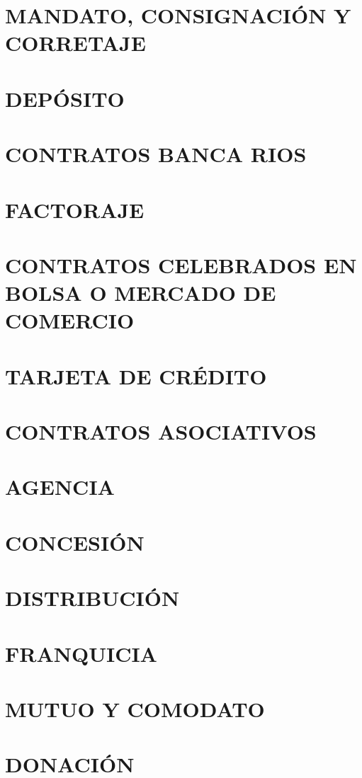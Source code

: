 \documentclass[12pt]{book}
\begin{document}
\chapter{MANDATO, CONSIGNACIÓN Y CORRETAJE}
\chapter{DEPÓSITO}
\chapter{CONTRATOS BANCA RIOS}
\chapter{FACTORAJE}
\chapter{CONTRATOS CELEBRADOS EN BOLSA O MERCADO DE COMERCIO}

\chapter{TARJETA DE CRÉDITO}
\chapter{CONTRATOS ASOCIATIVOS}
\chapter{AGENCIA}
\chapter{CONCESIÓN}
\chapter{DISTRIBUCIÓN}


\chapter{FRANQUICIA}
\chapter{MUTUO Y COMODATO}

\chapter{DONACIÓN}
\end{document}

